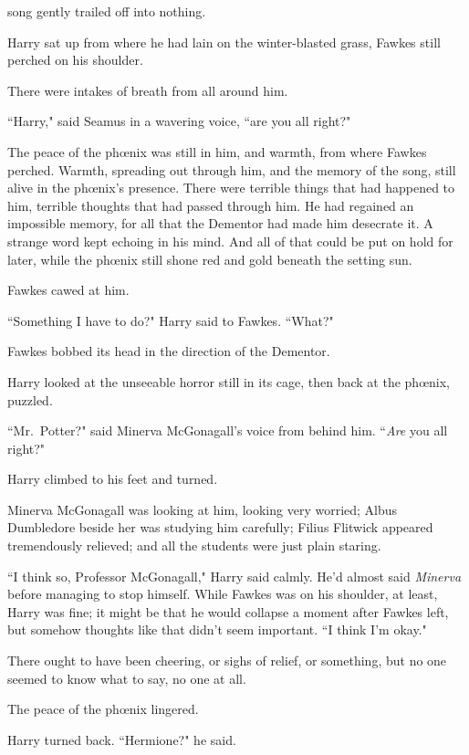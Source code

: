 
 song gently trailed off into nothing.

\hplettrineextrapara
Harry sat up from where he had lain on the winter-blasted grass, Fawkes still perched on his shoulder.

There were intakes of breath from all around him.

``Harry," said Seamus in a wavering voice, ``are you all right?"

The peace of the phœnix was still in him, and warmth, from where Fawkes perched. Warmth, spreading out through him, and the memory of the song, still alive in the phœnix's presence. There were terrible things that had happened to him, terrible thoughts that had passed through him. He had regained an impossible memory, for all that the Dementor had made him desecrate it. A strange word kept echoing in his mind. And all of that could be put on hold for later, while the phœnix still shone red and gold beneath the setting sun.

Fawkes cawed at him.

``Something I have to do?" Harry said to Fawkes. ``What?"

Fawkes bobbed its head in the direction of the Dementor.

Harry looked at the unseeable horror still in its cage, then back at the phœnix, puzzled.

``Mr.~Potter?" said Minerva McGonagall's voice from behind him. ``\emph{Are} you all right?"

Harry climbed to his feet and turned.

Minerva McGonagall was looking at him, looking very worried; Albus Dumbledore beside her was studying him carefully; Filius Flitwick appeared tremendously relieved; and all the students were just plain staring.

``I think so, Professor McGonagall," Harry said calmly. He'd almost said \emph{Minerva} before managing to stop himself. While Fawkes was on his shoulder, at least, Harry was fine; it might be that he would collapse a moment after Fawkes left, but somehow thoughts like that didn't seem important. ``I think I'm okay."

There ought to have been cheering, or sighs of relief, or something, but no one seemed to know what to say, no one at all.

The peace of the phœnix lingered.

Harry turned back. ``Hermione?" he said.

